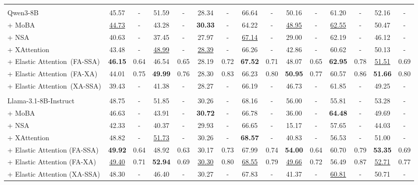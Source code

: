 \begin{table}[t]
{\begin{tabular}{l | cc | cc | cc | cc | cc | cc | cc}
\arrayrulecolor{black}\midrule
\rowcolor{blue!25}
\multicolumn{15}{c}{\textbf{Qwen3-8B backbone model}} \\
\arrayrulecolor{black!20}\midrule
Qwen3-8B & 45.57 & - & 51.59 & - & 28.34 & - & 66.64 & - & 50.16 & - & 61.20 & - & 52.16 & - \\
+ MoBA & \underline{44.73} & - & 43.28 & - & \bf 30.33 & - & 64.22 & - & \underline{48.95} & - & \underline{62.55} & - & 50.47 & - \\
+ NSA & 40.63 & - & 37.45 & - & 27.97 & - & \underline{67.14} & - & 29.00 & - & 62.19 & - & 46.12 & - \\
+ XAttention & 43.48 & - & \underline{48.99} & - & \underline{28.39} & - & 66.26 & - & 42.86 & - & 60.62 & - & 50.13 & - \\
\arrayrulecolor{black!40}\midrule
+ Elastic Attention~(FA-SSA)& \bf 46.15 & 0.64 & 46.54 & 0.65 & 28.19 & 0.72 & \bf 67.52 & 0.71 & 48.07 & 0.65 & \bf 62.95 & 0.78 & \underline{51.51} & 0.69 \\
+ Elastic Attention~(FA-XA)& 44.01 & 0.75 & \bf 49.99 & 0.76 & 28.30 & 0.83 & 66.23 & 0.80 & \bf 50.95 & 0.77 & 60.57 & 0.86 & \bf 51.66 & 0.80 \\
+ Elastic Attention~(XA-SSA) & 39.43 & - & 41.38 & - & 28.27 & - & 66.19 & - & 46.73 & - & 61.85 & - & 49.25 & - \\

\arrayrulecolor{black}\midrule
\rowcolor{cyan!20}
\multicolumn{15}{c}{\textbf{Llama-3.1-8B-Instruct backbone model}} \\
\arrayrulecolor{black!20}\midrule
Llama-3.1-8B-Instruct & 48.75 & - & 51.85 & - & 30.26 & - & 68.16 & - & 56.00 & - & 55.81 & - & 53.28 & - \\
+ MoBA & 46.63 & - & 43.91 & - & \bf 30.72 & - & 66.78 & - & 36.00 & - & \bf 64.48 & - & 49.69 & - \\
+ NSA & 42.33 & - & 40.37 & - & 29.93 & - & 66.65 & - & 15.17 & - & 57.65 & - & 44.03 & - \\
+ XAttention & 48.82 & - & \underline{51.73} & - & 30.26 & - & \bf 68.57 & - & 40.83 & - & 56.53 & - & 51.00 & - \\
\arrayrulecolor{black!40}\midrule
+ Elastic Attention (FA-SSA) & \textbf{49.92} & 0.64 & 48.92 & 0.63 & 30.17 & 0.73 & 67.99 & 0.74 & \bf 54.00 & 0.64 & 60.70 & 0.79 & \bf 53.35 & 0.69 \\
+ Elastic Attention (FA-XA) & \underline{49.40} & 0.71 & \bf 52.94 & 0.69 & \underline{30.30} & 0.80 & \underline{68.55} & 0.79 & \underline{49.66} & 0.72 & 56.49 & 0.87 & \underline{52.71} & 0.77 \\
+ Elastic Attention (XA-SSA) & 48.30 & - & 46.40 & - & 30.27 & - & 67.83 & - & 41.37 & - & \underline{60.81} & - & 50.71 & - \\


\end{tabular}}
\end{table}
